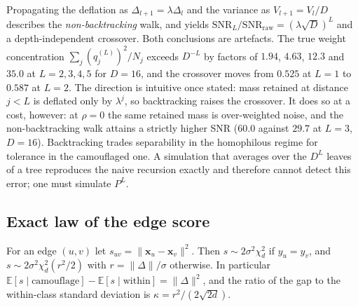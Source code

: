 \documentclass[../elsevier.tex]{subfiles}
\begin{document}
\begin{remark}
Propagating the deflation as $\Delta_{l+1} = \lambda\Delta_l$ and the variance as
$V_{l+1} = V_l/D$ describes the \emph{non-backtracking} walk, and yields
$\mathrm{SNR}_L/\mathrm{SNR}_{\mathrm{raw}} = (\lambda\sqrt D)^L$ and a
depth-independent crossover. Both conclusions are artefacts. The true weight
concentration $\sum_j (q^{(L)}_j)^2/N_j$ exceeds $D^{-L}$ by factors of $1.94$,
$4.63$, $12.3$ and $35.0$ at $L = 2,3,4,5$ for $D = 16$, and the crossover moves from
$0.525$ at $L=1$ to $0.587$ at $L=2$. The direction is intuitive once stated: mass retained at distance $j<L$ is deflated
only by $\lambda^{j}$, so backtracking raises the crossover. It does so at a cost,
however: at $\rho=0$ the same retained mass is over-weighted noise, and the
non-backtracking walk attains a strictly higher SNR ($60.0$ against $29.7$ at $L=3$,
$D=16$). Backtracking trades separability in the homophilous regime for tolerance in
the camouflaged one. A
simulation that averages over the $D^L$ leaves of a tree reproduces the naive
recursion exactly and therefore cannot detect this error; one must simulate $P^L$.
\end{remark}

\subsection{Exact law of the edge score}
\label{app:score}

\begin{lemma}
For an edge $(u,v)$ let $s_{uv} = \|\mathbf{x}_u - \mathbf{x}_v\|^2$. Then
$s \sim 2\sigma^2\chi^2_d$ if $y_u = y_v$, and
$s \sim 2\sigma^2\chi^2_d(r^2/2)$ with $r = \|\Delta\|/\sigma$ otherwise. In
particular $\mathbb{E}[s \mid \text{camouflage}] - \mathbb{E}[s \mid \text{within}]
= \|\Delta\|^2$, and the ratio of the gap to the within-class standard deviation is
$\kappa = r^2/(2\sqrt{2d})$.
\end{lemma}
\end{document}
